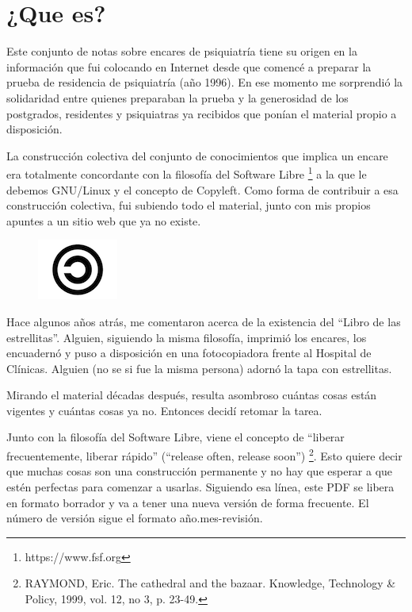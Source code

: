 \chapter{¿Que es?}
Este conjunto de notas sobre encares de psiquiatría tiene su origen en la información que fui colocando en Internet desde que comencé a preparar la prueba de residencia de psiquiatría (año 1996). En ese momento me sorprendió la solidaridad entre quienes preparaban la prueba y la generosidad de los postgrados, residentes y psiquiatras ya recibidos que ponían el material propio a disposición.

La construcción colectiva del conjunto de conocimientos que implica un encare era totalmente concordante con la filosofía del Software Libre \footnote{https://www.fsf.org} a la que le debemos GNU/Linux y el concepto de Copyleft. Como forma de contribuir a esa construcción colectiva, fui subiendo todo el material, junto con mis propios apuntes a un sitio web que ya no existe.

\begin{figure}
	\centering
    \includegraphics{copyleft.png}
\end{figure}
Hace algunos años atrás, me comentaron acerca de la existencia del ``Libro de las estrellitas''. Alguien, siguiendo la misma filosofía, imprimió los encares, los encuadernó y puso a disposición en una fotocopiadora frente al Hospital de Clínicas. Alguien (no se si fue la misma persona) adornó la tapa con estrellitas.

Mirando el material décadas después, resulta asombroso cuántas cosas están vigentes y cuántas cosas ya no. Entonces decidí retomar la tarea.

Junto con la filosofía del Software Libre, viene el concepto de ``liberar frecuentemente, liberar rápido'' (``release often, release soon'') \footnote{RAYMOND, Eric. The cathedral and the bazaar. Knowledge, Technology \& Policy, 1999, vol. 12, no 3, p. 23-49.}. Esto quiere decir que muchas cosas son una construcción permanente y no hay que esperar a que estén perfectas para comenzar a usarlas. Siguiendo esa línea, este PDF se libera en formato borrador y va a tener una nueva versión de forma frecuente. El número de versión sigue el formato año.mes-revisión.

